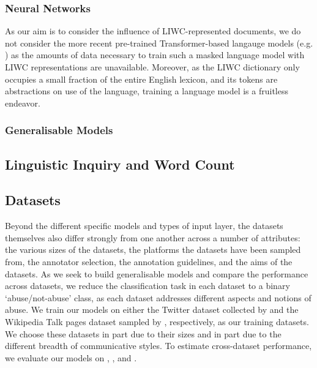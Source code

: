 \subsubsection{Neural Networks}

\cite{Zimmerman:2018,Park:2017,Gamback:2017}

As our aim is to consider the influence of LIWC-represented documents, we do not consider the more recent pre-trained Transformer-based langauge models (e.g. \cite{Devlin:2019, CITE: Roberta}) as the amounts of data necessary to train such a masked language model with LIWC representations are unavailable. Moreover, as the LIWC dictionary only occupies a small fraction of the entire English lexicon, and its tokens are abstractions on use of the language, training a language model is a fruitless endeavor.

\subsubsection{Generalisable Models}

\cite{Waseem:2016,Waseem:2018,Karan:2018}

\subsection{Linguistic Inquiry and Word Count}


\subsection{Datasets}
Beyond the different specific models and types of input layer, the datasets themselves also differ strongly from one another across a number of attributes: the various sizes of the datasets, the platforms the datasets have been sampled from, the annotator selection, the annotation guidelines, and the aims of the datasets. As we seek to build generalisable models and compare the performance across datasets, we reduce the classification task in each dataset to a binary `abuse/not-abuse' class, as each dataset addresses different aspects and notions of abuse.
We train our models on either the Twitter dataset collected by \citet{Davidson:2017} and the Wikipedia Talk pages dataset sampled by \citet{Wulczyn:2017}, respectively, as our training datasets. We choose these datasets in part due to their sizes and in part due to the different breadth of communicative styles. To estimate cross-dataset performance, we evaluate our models on \citet{Waseem-Hovy:2016}, \citet{Waseem:2016}, and \citet{Garcia:2019}.

